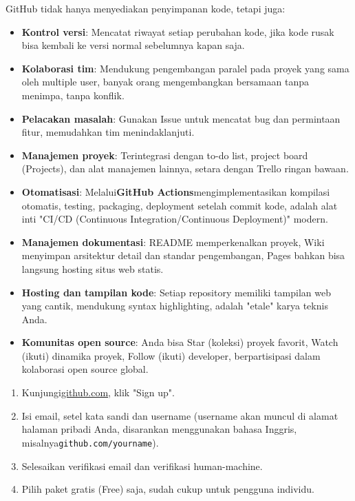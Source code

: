 
GitHub tidak hanya menyediakan penyimpanan kode, tetapi juga:

\begin{itemize}
  \item \textbf{Kontrol versi}: Mencatat riwayat setiap perubahan kode, jika kode rusak bisa kembali ke versi normal sebelumnya kapan saja.
  \item \textbf{Kolaborasi tim}: Mendukung pengembangan paralel pada proyek yang sama oleh multiple user, banyak orang mengembangkan bersamaan tanpa menimpa, tanpa konflik.
  \item \textbf{Pelacakan masalah}: Gunakan Issue untuk mencatat bug dan permintaan fitur, memudahkan tim menindaklanjuti.
  \item \textbf{Manajemen proyek}: Terintegrasi dengan to-do list, project board (Projects), dan alat manajemen lainnya, setara dengan Trello ringan bawaan.
  \item \textbf{Otomatisasi}: Melalui\textbf{GitHub Actions}mengimplementasikan kompilasi otomatis, testing, packaging, deployment setelah commit kode, adalah alat inti "CI/CD (Continuous Integration/Continuous Deployment)" modern.
  \item \textbf{Manajemen dokumentasi}: README memperkenalkan proyek, Wiki menyimpan arsitektur detail dan standar pengembangan, Pages bahkan bisa langsung hosting situs web statis.
  \item \textbf{Hosting dan tampilan kode}: Setiap repository memiliki tampilan web yang cantik, mendukung syntax highlighting, adalah "etale" karya teknis Anda.
  \item \textbf{Komunitas open source}: Anda bisa Star (koleksi) proyek favorit, Watch (ikuti) dinamika proyek, Follow (ikuti) developer, berpartisipasi dalam kolaborasi open source global.
\end{itemize}



\begin{enumerate}
  \item Kunjungi\href{https://github.com}{github.com}, klik "Sign up".
  \item Isi email, setel kata sandi dan username (username akan muncul di alamat halaman pribadi Anda, disarankan menggunakan bahasa Inggris, misalnya\texttt{github.\allowbreak com/\allowbreak yourname}).
  \item Selesaikan verifikasi email dan verifikasi human-machine.
  \item Pilih paket gratis (Free) saja, sudah cukup untuk pengguna individu.
\end{enumerate}

